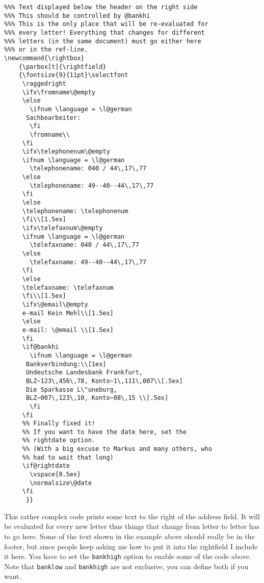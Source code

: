 \documentclass[a4paper]{article}
\begin{document}
\begin{verbatim}
%%% Text displayed below the header on the right side
%%% This should be controlled by @bankhi
%%% This is the only place that will be re-evaluated for
%%% every letter! Everything that changes for different
%%% letters (in the same document) must go either here
%%% or in the ref-line.
\newcommand{\rightbox}
    {\parbox[t]{\rightfield}
    {\fontsize{9}{11pt}\selectfont
     \raggedright
     \ifx\fromname\@empty
     \else
       \ifnum \language = \l@german
	  Sachbearbeiter:
       \fi
       \fromname\\
     \fi
     \ifx\telephonenum\@empty
	 \ifnum \language = \l@german
	   \telephonename: 040 / 44\,17\,77
	 \else
	   \telephonename: 49--40--44\,17\,77
	 \fi
     \else
	 \telephonename: \telephonenum
     \fi\\[1.5ex]
     \ifx\telefaxnum\@empty
	 \ifnum \language = \l@german
	   \telefaxname: 040 / 44\,17\,77
	 \else
	   \telefaxname: 49--40--44\,17\,77
	 \fi
     \else
	 \telefaxname: \telefaxnum
     \fi\\[1.5ex]
     \ifx\@email\@empty
	 e-mail Kein Mehl\\[1.5ex]
     \else
	 e-mail: \@email \\[1.5ex]
     \fi
     \if@bankhi
       \ifnum \language = \l@german
	  Bankverbindung:\\[1ex]
	  Undeutsche Landesbank Frankfurt,
	  BLZ~123\,456\,78, Konto~1\,111\,007\\[.5ex]
	  Die Sparkasse L\"uneburg,
	  BLZ~007\,123\,10, Konto~08\,15 \\[.5ex]
       \fi
     \fi
     %% Finally fixed it!
     %% If you want to have the date here, set the
     %% rightdate option.
     %% (With a big excuse to Markus and many others, who
     %% had to wait that long)
     \if@rightdate
       \vspace{0.5ex}
       \normalsize\@date
     \fi    
      }}
\end{verbatim}

This rather complex code prints some text to the right of the address 
field. It will be evaluated for every new letter thus things that 
change from letter to letter has to go here. Some of the text shown 
in the example above should really be in the footer, but since people 
keep asking me how to put it into the rightfield I include it here. 
You have to set the \texttt{bankhigh} option to enable some of the 
code above. Note that \texttt{banklow} and  \texttt{bankhigh} are 
not exclusive, you can define both if you want.
\end{document}
